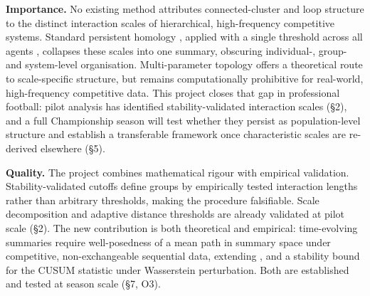 \textbf{Importance.} No existing method attributes connected-cluster and loop structure to the distinct interaction scales of hierarchical, high-frequency competitive systems. Standard persistent homology \citep{Carlsson2009,Zomorodian2005}, applied with a single threshold across all agents \citep{Edelsbrunner2010}, collapses these scales into one summary, obscuring individual-, group- and system-level organisation. Multi-parameter topology \citep{BotnanLesnick2022,Lesnick2015} offers a theoretical route to scale-specific structure, but remains computationally prohibitive for real-world, high-frequency competitive data. This project closes that gap in professional football: pilot analysis has identified stability-validated interaction scales (\S2), and a full Championship season will test whether they persist as population-level structure and establish a transferable framework once characteristic scales are re-derived elsewhere (\S5).

\textbf{Quality.} The project combines mathematical rigour with empirical validation. Stability-validated cutoffs define groups by empirically tested interaction lengths rather than arbitrary thresholds, making the procedure falsifiable. Scale decomposition and adaptive distance thresholds are already validated at pilot scale (\S2). The new contribution is both theoretical and empirical: time-evolving summaries require well-posedness of a mean path in summary space under competitive, non-exchangeable sequential data, extending \citep{Chazal2014}, and a stability bound for the CUSUM statistic under Wasserstein perturbation. Both are established and tested at season scale (\S7, O3).

